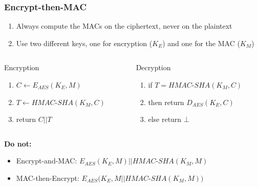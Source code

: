 \documentclass[aspectratio=169, lualatex, handout, 10pt,dvipsnames,svgnames]{beamer} %
\def\enrouge#1{\textcolor{rouge}{#1}}
\begin{document}
\begin{frame}
  \frametitle{Encrypt-then-MAC}

  \begin{enumerate}
  \item Always compute the MACs on the ciphertext, never on the plaintext
  \item Use two different keys, one for encryption ($K_E$) and one for the MAC ($K_M$)
  \end{enumerate}
  \bigskip{}

  \begin{block}
  \small
  \begin{columns}
    \begin{column}[c]{2in}
      \enrouge{Encryption}
      \begin{enumerate}
      \item $C\leftarrow E_{AES}(K_E, M)$
      \item $T\leftarrow HMAC$-$SHA(K_M, C)$
      \item return $C||T$
      \end{enumerate}
    \end{column}
    \begin{column}[c]{2in}
      \enrouge{Decryption}
      \begin{enumerate}
      \item if $T=HMAC$-$SHA(K_M, C)$
      \item then return $D_{AES}(K_E, C)$
      \item else return $\bot$
      \end{enumerate}
    \end{column}
  \end{columns}
\end{block}
  \bigskip{}
  \normalsize

  \enrouge{\bf Do not:}
  \begin{itemize}
  \item Encrypt-and-MAC: $E_{AES}(K_E, M) || HMAC$-$SHA(K_M, M)$
  \item MAC-then-Encrypt: $E_{AES}(K_E, M|| HMAC$-$SHA(K_M, M)) $
  \end{itemize}

\end{frame}
\end{document}
